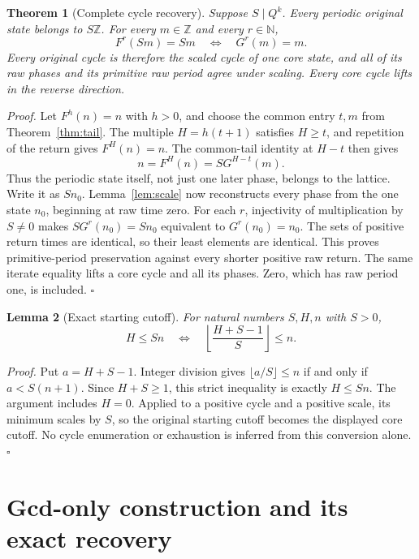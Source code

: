 \documentclass[11pt,letterpaper]{article}
\newcommand{\N}{\mathbb{N}}
\newcommand{\Z}{\mathbb{Z}}
\newtheorem{theorem}{Theorem}
\newtheorem{lemma}[theorem]{Lemma}
\newenvironment{proof}{\noindent\textit{Proof.}}{\hfill\(\square\)}
\begin{document}
\begin{theorem}[Complete cycle recovery]
\label{thm:cycles}
Suppose \(S\mid Q^k\). Every periodic original state belongs to \(S\Z\).
For every \(m\in\Z\) and every \(r\in\N\),
\[
F^r(Sm)=Sm\quad\Longleftrightarrow\quad G^r(m)=m.
\]
Every original cycle is therefore the scaled cycle of one core state, and
all of its raw phases and its primitive raw period agree under scaling.
Every core cycle lifts in the reverse direction.
\end{theorem}
\begin{proof}
Let \(F^h(n)=n\) with \(h>0\), and choose the common entry \(t,m\) from
Theorem~\ref{thm:tail}. The multiple \(H=h(t+1)\) satisfies \(H\ge t\),
and repetition of the return gives \(F^H(n)=n\). The common-tail identity
at \(H-t\) then gives
\[
n=F^H(n)=S G^{H-t}(m).
\]
Thus the periodic state itself, not just one later phase, belongs to the
lattice. Write it as \(Sn_0\). Lemma~\ref{lem:scale} now reconstructs every
phase from the one state \(n_0\), beginning at raw time zero.
For each \(r\), injectivity of multiplication by \(S\ne0\) makes
\(S G^r(n_0)=Sn_0\) equivalent to \(G^r(n_0)=n_0\).
The sets of positive return times are identical, so their least elements
are identical. This proves primitive-period preservation against every
shorter positive raw return. The same iterate equality lifts a core cycle
and all its phases. Zero, which has raw period one, is included.
\end{proof}

\begin{lemma}[Exact starting cutoff]
\label{lem:ceiling}
For natural numbers \(S,H,n\) with \(S>0\),
\[
H\le Sn\quad\Longleftrightarrow\quad
\left\lfloor\frac{H+S-1}{S}\right\rfloor\le n.
\]
\end{lemma}
\begin{proof}
Put \(a=H+S-1\). Integer division gives
\(\lfloor a/S\rfloor\le n\) if and only if \(a<S(n+1)\).
Since \(H+S\ge1\), this strict inequality is exactly \(H\le Sn\).
The argument includes \(H=0\). Applied to a positive cycle and a positive
scale, its minimum scales by \(S\), so the original starting cutoff becomes
the displayed core cutoff. No cycle enumeration or exhaustion is inferred
from this conversion alone.
\end{proof}

\section{Gcd-only construction and its exact recovery}
\end{document}
